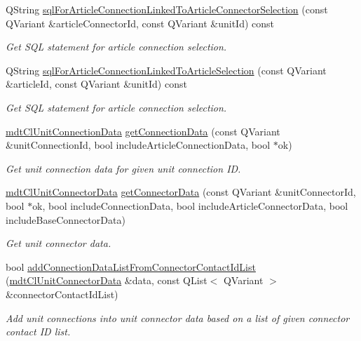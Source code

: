 \begin{DoxyCompactItemize}
Q\-String \hyperlink{classmdt_cl_unit_adc3fcf6f85c715dd31700186ac775e24}{sql\-For\-Article\-Connection\-Linked\-To\-Article\-Connector\-Selection} (const Q\-Variant \&article\-Connector\-Id, const Q\-Variant \&unit\-Id) const 
\begin{DoxyCompactList}\small\item\em Get S\-Q\-L statement for article connection selection. \end{DoxyCompactList}\item 
Q\-String \hyperlink{classmdt_cl_unit_a35befd3bf556fc29f0d3d1e1aa9a69cf}{sql\-For\-Article\-Connection\-Linked\-To\-Article\-Selection} (const Q\-Variant \&article\-Id, const Q\-Variant \&unit\-Id) const 
\begin{DoxyCompactList}\small\item\em Get S\-Q\-L statement for article connection selection. \end{DoxyCompactList}\item 
\hyperlink{classmdt_cl_unit_connection_data}{mdt\-Cl\-Unit\-Connection\-Data} \hyperlink{classmdt_cl_unit_a73c87dcbb0f21a16849e5c04d35753aa}{get\-Connection\-Data} (const Q\-Variant \&unit\-Connection\-Id, bool include\-Article\-Connection\-Data, bool $\ast$ok)
\begin{DoxyCompactList}\small\item\em Get unit connection data for given unit connection I\-D. \end{DoxyCompactList}\item 
\hyperlink{classmdt_cl_unit_connector_data}{mdt\-Cl\-Unit\-Connector\-Data} \hyperlink{classmdt_cl_unit_ae0992fd5a8807953ee882487c3aaa4b0}{get\-Connector\-Data} (const Q\-Variant \&unit\-Connector\-Id, bool $\ast$ok, bool include\-Connection\-Data, bool include\-Article\-Connector\-Data, bool include\-Base\-Connector\-Data)
\begin{DoxyCompactList}\small\item\em Get unit connector data. \end{DoxyCompactList}\item 
bool \hyperlink{classmdt_cl_unit_ac05aad687744aaedeef602075e28fdf7}{add\-Connection\-Data\-List\-From\-Connector\-Contact\-Id\-List} (\hyperlink{classmdt_cl_unit_connector_data}{mdt\-Cl\-Unit\-Connector\-Data} \&data, const Q\-List$<$ Q\-Variant $>$ \&connector\-Contact\-Id\-List)
\begin{DoxyCompactList}\small\item\em Add unit connections into unit connector data based on a list of given connector contact I\-D list. \end{DoxyCompactList}\item 

\end{DoxyCompactItemize}
